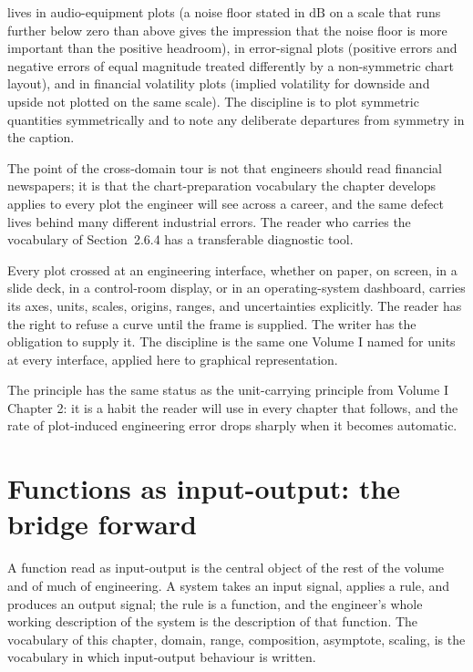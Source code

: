  lives in
audio-equipment plots (a noise floor stated in $\si{\deci\bel}$ on
a scale that runs further below zero than above gives the
impression that the noise floor is more important than the
positive headroom), in error-signal plots (positive errors and
negative errors of equal magnitude treated differently by a
non-symmetric chart layout), and in financial volatility plots
(implied volatility for downside and upside not plotted on the
same scale). The discipline is to plot symmetric quantities
symmetrically and to note any deliberate departures from symmetry
in the caption.

The point of the cross-domain tour is not that engineers should
read financial newspapers; it is that the chart-preparation
vocabulary the chapter develops applies to every plot the engineer
will see across a career, and the same defect lives behind many
different industrial errors. The reader who carries the vocabulary
of Section~2.6.4 has a transferable diagnostic tool.

\begin{principle}
Every plot crossed at an engineering interface, whether on paper, on
screen, in a slide deck, in a control-room display, or in an
operating-system dashboard, carries its axes, units, scales,
origins, ranges, and uncertainties explicitly. The reader has the
right to refuse a curve until the frame is supplied. The writer has
the obligation to supply it. The discipline is the same one Volume I
named for units at every interface, applied here to graphical
representation.
\end{principle}

The principle has the same status as the unit-carrying principle
from Volume I Chapter 2: it is a habit the reader will use in every
chapter that follows, and the rate of plot-induced engineering error
drops sharply when it becomes automatic.

\section{Functions as input-output: the bridge forward}

A function read as input-output is the central object of the rest of
the volume and of much of engineering. A system takes an input
signal, applies a rule, and produces an output signal; the rule is a
function, and the engineer's whole working description of the system
is the description of that function. The vocabulary of this chapter,
domain, range, composition, asymptote, scaling, is the vocabulary in
which input-output behaviour is written.


